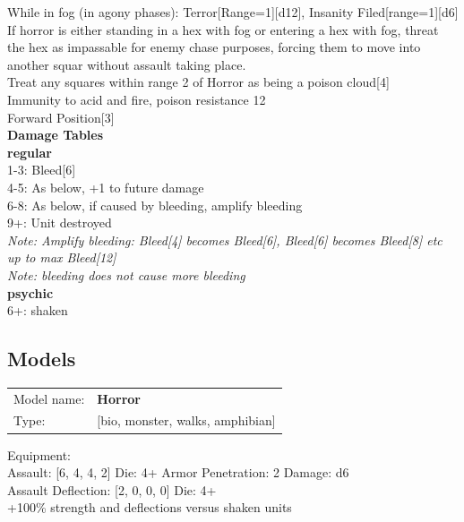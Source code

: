 While in fog (in agony phases): Terror[Range=1][d12], Insanity Filed[range=1][d6]\\ 
If horror is either standing in a hex with fog or entering a hex with fog, threat the hex as impassable for enemy chase purposes, forcing them to move into another squar without assault taking place.\\ 
Treat any squares within range 2 of Horror as being a poison cloud[4]\\ 
Immunity to acid and fire, poison resistance 12\\ 
Forward Position[3]\\ 



{\bf Damage Tables} \\
 {\bf regular } \\
1-3: Bleed[6] \\
4-5: As below, +1 to future damage \\
6-8: As below, if caused by bleeding, amplify bleeding \\
9+: Unit destroyed \\
{{\it Note:  Amplify bleeding: Bleed[4] becomes Bleed[6], Bleed[6] becomes Bleed[8] etc up to max Bleed[12]}} \\
{{\it Note: bleeding does not cause more bleeding}} \\
 {\bf psychic } \\
6+: shaken \\


\clearpage

\subsection{ Models }

\begin{tabular}{ll}
Model name: & {\bf Horror } \\
Type: & [bio, monster, walks, amphibian] \\
\end{tabular}

Equipment:  \\

Assault: [6, 4, 4, 2] Die: 4+ Armor Penetration: 2 Damage: d6 \\
Assault Deflection: [2, 0, 0, 0] Die: 4+\\
\indent +100\% strength and deflections versus shaken units\\ 
 




